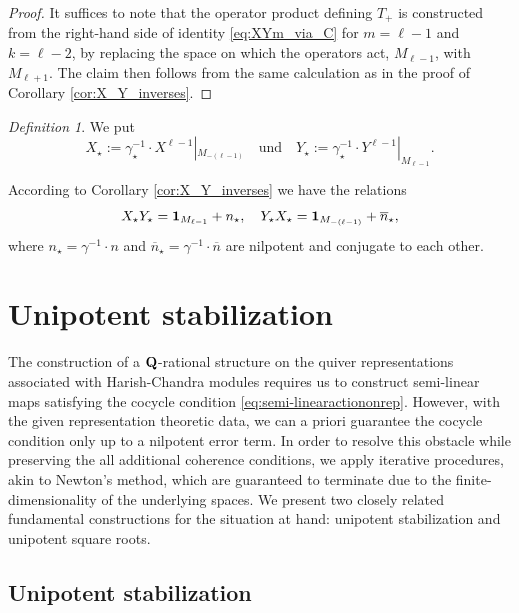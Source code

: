 \documentclass[a4paper,12pt,reqno]{amsart}
\newcommand{\QQ}{{\rm\bf Q}}
\theoremstyle{plain}
\theoremstyle{remark}
\newtheorem{definition}[theorem]{Definition}
\begin{document}
  \begin{proof}
    It suffices to note that the operator product defining $T_+$ is constructed from the right-hand side of identity \eqref{eq:XYm_via_C} for $m=\ell-1$ and $k=\ell-2$, by replacing the space on which the operators act, $M_{\ell-1}$, with $M_{\ell+1}$. The claim then follows from the same calculation as in the proof of Corollary \ref{cor:X_Y_inverses}.
  \end{proof}
  
  \begin{definition}
    We put
    \begin{equation}
      X_\star:=\gamma_\star^{-1}\cdot X^{\ell-1}|_{M_{-(\ell-1)}}\quad\text{und}\quad Y_\star:=\gamma_\star^{-1}\cdot Y^{\ell-1}|_{M_{\ell-1}}.
    \end{equation}
  \end{definition}
  
  According to Corollary \ref{cor:X_Y_inverses} we have the relations
  \begin{equation}
    X_\star Y_\star = {\bf1}_{M_{\ell-1}}+n_\star,\quad
    Y_\star X_\star = {\bf1}_{M_{-(\ell-1)}}+\overline{n}_\star,
  \end{equation}
  where $n_\star=\gamma^{-1}\cdot n$ and $\overline{n}_\star=\gamma^{-1}\cdot\overline{n}$ are nilpotent and conjugate to each other.
  
  
  \section{Unipotent stabilization}\label{sec:unipotentstabilization}

  The construction of a $\QQ$-rational structure on the quiver representations associated with Harish-Chandra modules requires us to construct semi-linear maps satisfying the cocycle condition \eqref{eq:semi-linearactiononrep}. However, with the given representation theoretic data, we can a priori guarantee the cocycle condition only up to a nilpotent error term. In order to resolve this obstacle while preserving the all additional coherence conditions, we apply iterative procedures, akin to Newton's method, which are guaranteed to terminate due to the finite-dimensionality of the underlying spaces. We present two closely related fundamental constructions for the situation at hand: unipotent stabilization and unipotent square roots.

  \subsection{Unipotent stabilization}
\end{document}
